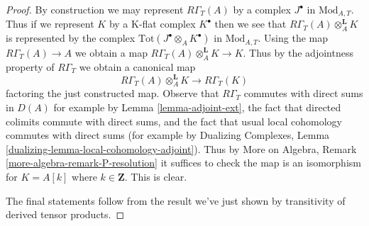 \documentclass[10pt,a4paper]{amsart}
\theoremstyle{plain}
\theoremstyle{definition}
\theoremstyle{remark}
\numberwithin{equation}{subsection}
\begin{document}
\begin{proof}
By construction we may represent $R\Gamma_T(A)$ by a complex $J^\bullet$ in
$\text{Mod}_{A, T}$. Thus if we represent $K$ by a K-flat complex $K^\bullet$
then we see that $R\Gamma_T(A) \otimes_A^\mathbf{L} K$ is represented
by the complex $\text{Tot}(J^\bullet \otimes_A K^\bullet)$ in
$\text{Mod}_{A, T}$. Using the map $R\Gamma_T(A) \to A$ we obtain
a map $R\Gamma_T(A) \otimes_A^\mathbf{L} K\to K$. Thus by the adjointness
property of $R\Gamma_T$ we obtain a canonical map
$$
R\Gamma_T(A) \otimes_A^\mathbf{L} K \longrightarrow R\Gamma_T(K)
$$
factoring the just constructed map. Observe that $R\Gamma_T$ commutes
with direct sums in $D(A)$ for example by Lemma \ref{lemma-adjoint-ext},
the fact that directed colimits commute with direct sums, and the
fact that usual local cohomology commutes with direct sums
(for example by Dualizing Complexes, Lemma
\ref{dualizing-lemma-local-cohomology-adjoint}).
Thus by More on Algebra, Remark \ref{more-algebra-remark-P-resolution}
it suffices to check the map is an isomorphism for
$K = A[k]$ where $k \in \mathbf{Z}$. This is clear.

\medskip\noindent
The final statements follow from the result we've just shown
by transitivity of derived tensor products.
\end{proof}
\end{document}
